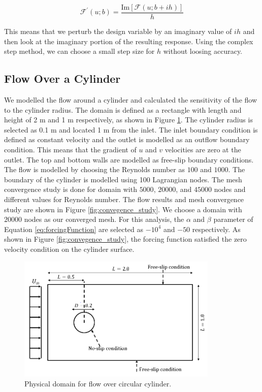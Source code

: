 \documentclass[12pt]{aiaa-pretty}
\begin{document}
%
\begin{equation}\label{eq:compelxStepFormula}
	\mathcal{F}^\prime\left(u; b\right) = \frac{\text{Im}\left[ \mathcal{F}\left(u; b + ih\right) \right]}{h}
\end{equation}
%

This means that we perturb the design variable by an imaginary value of $ih$ and then look at the imaginary portion of the resulting response. Using the complex step method, we can choose a small step size for $h$ without loosing accuracy.

\subsection{Flow Over a Cylinder}
We modelled the flow around a cylinder and calculated the sensitivity of the flow to the cylinder radius. The domain is defined as a rectangle with length and height of 2 m and 1 m respectively, as shown in Figure \ref{fig:cylinderDomain}. The cylinder radius is selected as 0.1 m and located 1 m from the inlet. The inlet boundary condition is defined as constant velocity and the outlet is modelled as an outflow boundary condition. This means that the gradient of $u$ and $v$ velocities are zero at the outlet. The top and bottom walls are modelled as free-slip boundary conditions. The flow is modelled by choosing the Reynolds number as $100$ and $1000$. The boundary of the cylinder is modelled using 100 Lagrangian nodes. The mesh convergence study is done for domain with $5000$, $20000$, and $45000$ nodes and different values for Reynolds number. The flow results and mesh convergence study are shown in Figure \ref{fig:convegence_study}. We choose a domain with $20000$ nodes as our converged mesh. For this analysis, the $\alpha$ and $\beta$ parameter of Equation \eqref{eq:forcingFunction} are selected as $-10^4$ and $-50$ respectively. As shown in Figure \ref{fig:convegence_study}, the forcing function satisfied the zero velocity condition on the cylinder surface.

%
\begin{figure}[H]
	\centering
	\includegraphics[height=6.0cm]{figure/cylinder/domain.png}
	\caption{Physical domain for flow over circular cylinder.}
	\label{fig:cylinderDomain}
\end{figure}
%
\end{document}
